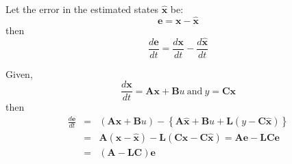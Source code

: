 Let the error in the estimated states $\hat{\mathbf{x}}$ be:
\[
\mathbf{e}=\mathbf{x}-\hat{\mathbf{x}}
\]
then
\[
\frac{d\mathbf{e}}{dt}=\frac{d\mathbf{x}}{dt}-\frac{d\hat{\mathbf{x}}}{dt}
\]

Given,
\[
\frac{d\mathbf{x}}{dt}=\mathbf{A}\mathbf{x}+\mathbf{B}u\ \mathrm{and}\ y=\mathbf{C}\mathbf{x}
\] 
then
\begin{eqnarray*}
	\frac{d\mathbf{e}}{dt} & = & \left(\mathbf{A}\mathbf{x}+\mathbf{B}u\right)-\left\{\mathbf{A}\hat{\mathbf{x}}+\mathbf{B}u+\mathbf{L}(y-\mathbf{C}\hat{\mathbf{x}})\right\} \\
	& = & \mathbf{A}(\mathbf{x}-\hat{\mathbf{x}})-\mathbf{L}(\mathbf{C}\mathbf{x}-\mathbf{C}\hat{\mathbf{x}}) = \mathbf{Ae}-\mathbf{LCe}\\
	& = & (\mathbf{A}-\mathbf{LC})\mathbf{e}
\end{eqnarray*}


\endinput


